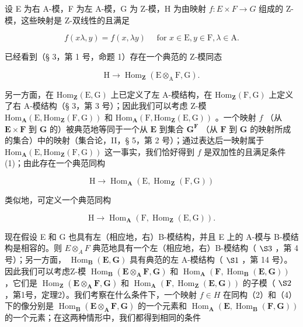 设 E 为右 A-模，F 为左 A-模，G 为 Z-模，H 为由映射 \(f: E \times F \rightarrow G\) 组成的 Z-模，这些映射是 Z-双线性的且满足

\[
f (x \lambda , y) = f (x, \lambda y) \quad \text { for } x \in \mathrm{E}, y \in \mathrm{F}, \lambda \in \mathrm{A}.\tag{1}
\]

已经看到（§ 3，第 1 号，命题 1）存在一个典范的 Z-模同态

\[
\mathrm{H} \rightarrow \operatorname{Hom} _ {\mathbf {Z}} (\mathrm{E} \otimes_ {\mathrm{A}} \mathrm{F}, \mathrm{G}).\tag{2}
\]

另一方面，在 \(\mathrm{Hom}_{\mathbf{Z}}(\mathrm{E},\mathrm{G})\) 上已定义了左 A-模结构，在 \(\mathrm{Hom}_{\mathbf{Z}}(\mathrm{F},\mathrm{G})\) 上定义了右 A-模结构（§ 3，第 3 号）；因此我们可以考虑 Z-模 \(\mathrm{Hom}_{\mathbf{A}}(\mathrm{E},\mathrm{Hom}_{\mathbf{Z}}(\mathrm{F},\mathrm{G}))\) 和 \(\mathrm{Hom}_{\mathbf{A}}(\mathrm{F},\mathrm{Hom}_{\mathbf{Z}}(\mathrm{E},\mathrm{G}))\) 。一个映射 \(f\) （从 \(\mathbf{E} \times \mathbf{F}\) 到 \(\mathbf{G}\) 的）被典范地等同于一个从 \(\mathbf{E}\) 到集合 \(\mathbf{G}^{\mathbf{F}}\) （从 \(\mathbf{F}\) 到 \(\mathbf{G}\) 的映射所成的集合）中的映射（集合论，II，§ 5，第 2 号）；通过表达后一映射属于 \(\mathrm{Hom}_{\mathbf{A}}(\mathrm{E},\mathrm{Hom}_{\mathbf{Z}}(\mathrm{F},\mathrm{G}))\) 这一事实，我们恰好得到 \(f\) 是双加性的且满足条件 (1)；由此存在一个典范同构

\[
\mathrm{H} \rightarrow \operatorname{Hom} _ {\mathbf {A}} (\mathrm{E}, \operatorname{Hom} _ {\mathbf {Z}} (\mathrm{F}, \mathrm{G}))\tag{3}
\]

类似地，可定义一个典范同构

\[
\mathrm{H} \rightarrow \operatorname{Hom} _ {\mathbf {A}} (\mathrm{F}, \operatorname{Hom} _ {\mathbf {Z}} (\mathrm{E}, \mathrm{G})).\tag{4}
\]

现在假设 E 和 G 也具有左（相应地，右）B-模结构，并且 E 上的 A-模与 B-模结构是相容的。则 \(E \otimes_{A} F\) 典范地具有一个左（相应地，右）B-模结构（ \(\S 3\) ，第 4 号）；另一方面， \(\operatorname{Hom}_{\mathbf{B}}(\mathbf{E}, \mathbf{G})\) 具有典范的左 A-模结构（ \(\S 1\) ，第 14 号）。因此我们可以考虑Z-模 \(\operatorname{Hom}_{\mathbf{B}}(\mathbf{E} \otimes_{\mathbf{A}} \mathbf{F}, \mathbf{G})\) 和 \(\operatorname{Hom}_{\mathbf{A}}(\mathbf{F}, \operatorname{Hom}_{\mathbf{B}}(\mathbf{E}, \mathbf{G}))\) ，它们是 \(\operatorname{Hom}_{\mathbf{Z}}(\mathbf{E} \otimes_{\mathbf{A}} \mathbf{F}, \mathbf{G})\) 和 \(\operatorname{Hom}_{\mathbf{A}}(\mathbf{F}, \operatorname{Hom}_{\mathbf{Z}}(\mathbf{E}, \mathbf{G}))\) 的子模（ \(\S 2\) ，第1号，定理2）。我们考察在什么条件下，一个映射 \(f \in H\) 在同构（2）和（4）下的像分别是 \(\operatorname{Hom}_{\mathbf{B}}(\mathbf{E} \otimes_{\mathbf{A}} \mathbf{F}, \mathbf{G})\) 的一个元素和 \(\operatorname{Hom}_{\mathbf{A}}(\mathbf{E}, \operatorname{Hom}_{\mathbf{B}}(\mathbf{F}, \mathbf{G}))\) 的一个元素；在这两种情形中，我们都得到相同的条件

